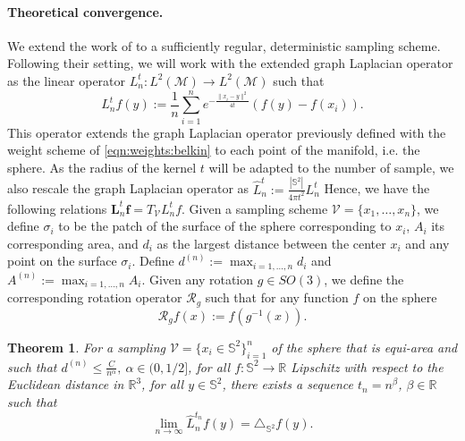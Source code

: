 \documentclass{article} %
\newtheorem{theorem}{Theorem}[section]
\renewcommand{\b}[1]{{\bm{#1}}}  %
\newcommand{\R}{\mathbb{R}}
\renewcommand{\S}{\mathbb{S}}
\newcommand{\V}{\mathcal{V}}  %
\newcommand{\nati}[1]{{\color[rgb]{.3,.5,.9}{#1}}}
\newcommand{\linefrac}[2]{
    {#1/#2}
}
\begin{document}
\paragraph{Theoretical convergence.}
We extend the work of \citep{belkin2005towards} to a sufficiently regular, deterministic sampling scheme.
Following their setting, we will work with the extended graph Laplacian operator as the linear operator $L_n^t: L^{2}(\mathcal{M}) \rightarrow L^{2}(\mathcal{M})$ such that
	\begin{equation}
	\label{eq:Heat Kernel Graph Laplacian operator}
	 L_n^t f(y) := \frac{1}{n}\sum_{i=1}^{n} e^{ -\frac{\|x_i-y\|^2}{4t}} \left(f(y)-f(x_i)\right).
	\end{equation}
This operator extends the graph Laplacian operator previously defined with the weight scheme of \eqref{eqn:weights:belkin} to each point of the manifold, i.e. the sphere.
As the radius of the kernel $t$ will be adapted to the number of sample, we also rescale the graph Laplacian operator as
	 $\hat{L}_n^t := \frac{|\mathbb S^2|}{4\pi t^2}L_n^t$
Hence, we have the following relations $\b{L}_n^t \b{f} = T_\V L_n^t f$.
Given a sampling scheme $\V = \{x_1, \dots, x_n\}$, we define $\sigma_i$ to be the patch of the surface of the sphere corresponding to $x_i$, $A_i$ its corresponding area, and $d_i$ as the largest distance between the center $x_i$ and any point on the surface $\sigma_i$.
Define $d^{(n)} := \max_{i=1, \dots, n} d_i$ and $A^{(n)} := \max_{i=1, \dots, n} A_i$.
Given any rotation $g\in SO(3)$, we define the corresponding rotation operator $\mathcal R_g$ such that for any function $f$ on the sphere
\begin{equation}\label{eq:rotation operator}
	\mathcal R_g f(x) := f(g^{-1}(x)).
\end{equation}
\begin{theorem}
	For a sampling $\V = \{x_i\in\S^2\}_{i=1}^n$ of the sphere that is equi-area and such that $d^{(n)} \leq \frac{C}{n^\alpha}, \ \alpha\in (0,\linefrac{1}{2}]$, for all $f: \S^2 \rightarrow \R$ Lipschitz with respect to the Euclidean distance in $\R^3$, for all $y\in\S^2$, there exists a sequence $t_n = n^\beta$, $\beta\in\mathbb R$ such that
	\begin{equation*}
		\lim_{n\to\infty}\hat{L}_n^{t_n}f(y) = \triangle_{\S^2}f(y).
	\end{equation*}
	\label{theo:pointwise convergence for a regular sampling}
\end{theorem}
\end{document}
